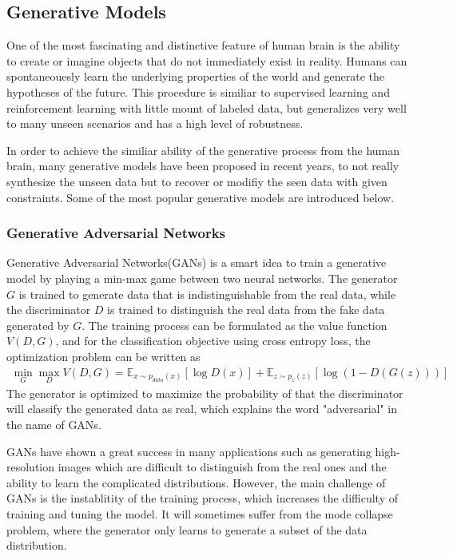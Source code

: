 \documentclass[12pt,DIV14,BCOR12mm,a4paper,footinclude=false,headinclude,parskip=half-,twoside,openright,cleardoublepage=empty,toc=index,bibliography=totoc,listof=totoc]{scrreprt}
\numberwithin{equation}{chapter}
\begin{document}
\subsection{Generative Models}
One of the most fascinating and distinctive feature of human brain is the ability to create or imagine objects that do not immediately exist in reality. Humans can spontaneouesly learn the underlying properties of the world and generate the hypotheses of the future. This procedure is similiar to supervised learning and reinforcement learning with little mount of labeled data, but generalizes very well to many unseen scenarios and has a high level of robustness\cite{lamb2021brief}.

In order to achieve the similiar ability of the generative process from the human brain, many generative models have been proposed in recent years, to not really synthesize the unseen data but to recover or modifiy the seen data with given constraints. Some of the most popular generative models are introduced below.

\subsubsection{Generative Adversarial Networks}
Generative Adversarial Networks(GANs)\cite{goodfellow2014generative} is a smart idea to train a generative model by playing a min-max game between two neural networks. The generator $G$ is trained to generate data that is indistinguishable from the real data, while the discriminator $D$ is trained to distinguish the real data from the fake data generated by $G$. The training process can be formulated as the value function $V(D,G)$, and for the classification objective using cross entropy loss, the optimization problem can be written as
\begin{align}
  \min_{G} \max_{D} V(D,G) = \mathbb{E}_{x\sim p_{data}(x)}[\log D(x)] + \mathbb{E}_{z\sim p_{z}(z)}[\log(1-D(G(z)))]
\end{align}
The generator is optimized to maximize the probability of that the discriminator will classify the generated data as real, which explains the word "adversarial" in the name of GANs.

GANs have shown a great success in many applications such as generating high-resolution images which are difficult to distinguish from the real ones and the ability to learn the complicated distributions. However, the main challenge of GANs is the instablitity of the training process, which increases the difficulty of training and tuning the model. It will sometimes suffer from the mode collapse problem, where the generator only learns to generate a subset of the data distribution\cite{borji2018pros}.
\end{document}
